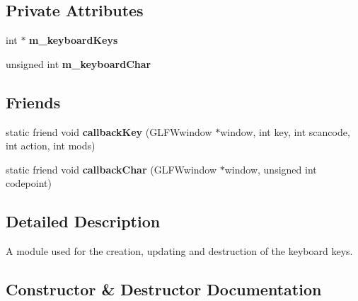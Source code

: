 \subsection*{Private Attributes}
\begin{DoxyCompactItemize}
\item 
\mbox{\label{classflounder_1_1keyboard_a001e792e18b8f7bf5814029e8684578b}} 
int $\ast$ {\bfseries m\+\_\+keyboard\+Keys}
\item 
\mbox{\label{classflounder_1_1keyboard_a451428c05636425eb75a4fcaced9722c}} 
unsigned int {\bfseries m\+\_\+keyboard\+Char}
\end{DoxyCompactItemize}
\subsection*{Friends}
\begin{DoxyCompactItemize}
\item 
\mbox{\label{classflounder_1_1keyboard_a3d2cf2b20a6cc547f9713721b611f3a5}} 
static friend void {\bfseries callback\+Key} (G\+L\+F\+Wwindow $\ast$window, int key, int scancode, int action, int mods)
\item 
\mbox{\label{classflounder_1_1keyboard_a9b3f2468fcab78376eaf4085ca8c4172}} 
static friend void {\bfseries callback\+Char} (G\+L\+F\+Wwindow $\ast$window, unsigned int codepoint)
\end{DoxyCompactItemize}


\subsection{Detailed Description}
A module used for the creation, updating and destruction of the keyboard keys. 



\subsection{Constructor \& Destructor Documentation}
\mbox{\label{classflounder_1_1keyboard_a2545f195eb7f57530cdc9056f641702c}} 
